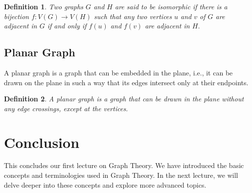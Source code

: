 \documentclass{article}
\newtheorem{definition}{Definition}
\begin{document}
\begin{definition}
	Two graphs \(G\) and \(H\) are said to be \textit{isomorphic} if there is a bijection \(f: V(G) \rightarrow V(H)\) such that any two vertices \(u\) and \(v\) of \(G\) are adjacent in \(G\) if and only if \(f(u)\) and \(f(v)\) are adjacent in \(H\).
\end{definition}

\subsection{Planar Graph}
A planar graph is a graph that can be embedded in the plane, i.e., it can be drawn on the plane in such a way that its edges intersect only at their endpoints.

\begin{definition}
	A \textit{planar graph} is a graph that can be drawn in the plane without any edge crossings, except at the vertices.
\end{definition}

\section{Conclusion}
This concludes our first lecture on Graph Theory. We have introduced the basic concepts and terminologies used in Graph Theory. In the next lecture, we will delve deeper into these concepts and explore more advanced topics.
\end{document}
